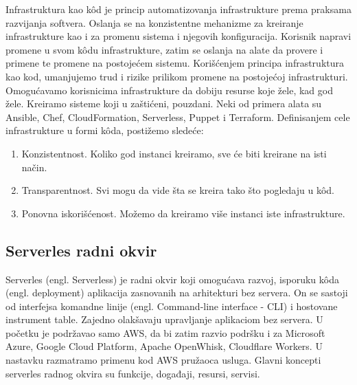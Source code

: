 \documentclass[12pt,oneside]{memoir}
\begin{document}
Infrastruktura kao kôd je princip automatizovanja infrastrukture prema praksama razvijanja softvera\cite{iac}. Oslanja se na konzistentne mehanizme za kreiranje infrastrukture kao i za promenu sistema i njegovih konfiguracija. Korisnik napravi promene u svom kôdu infrastrukture, zatim se oslanja na alate da provere i primene te promene na postojećem sistemu. Korišćenjem principa infrastruktura kao kod, umanjujemo trud i rizike prilikom promene na postojećoj infrastrukturi. Omogućavamo korisnicima infrastrukture da dobiju resurse koje žele, kad god žele. Kreiramo sisteme koji u zaštićeni, pouzdani. Neki od primera alata su Ansible, Chef, CloudFormation, Serverless, Puppet i Terraform. Definisanjem cele infrastrukture u formi kôda, postižemo sledeće\cite{iac}:
\begin{enumerate}
  \item Konzistentnost. Koliko god instanci kreiramo, sve će biti kreirane na isti način.
  \item Transparentnost. Svi mogu da vide šta se kreira tako što pogledaju u kôd.
  \item Ponovna iskorišćenost. Možemo da kreiramo više instanci iste infrastrukture.
\end{enumerate}
 
\subsection{Serverles radni okvir}
 
Serverles (engl. Serverless) je radni okvir koji omogućava razvoj, isporuku kôda (engl. deployment) aplikacija zasnovanih na arhitekturi bez servera. On se sastoji od interfejsa komandne linije (engl. Command-line interface - CLI) i hostovane instrument table. Zajedno olakšavaju upravljanje aplikaciom bez servera. U početku je podržavao samo AWS, da bi zatim razvio podršku i za Microsoft Azure, Google Cloud Platform, Apache OpenWhisk, Cloudflare Workers. U nastavku razmatramo primenu kod AWS pružaoca usluga. Glavni koncepti serverles radnog okvira su funkcije, događaji, resursi, servisi. 
 
\end{document}

